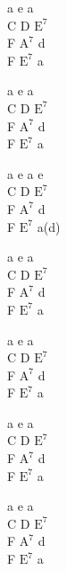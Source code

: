 \begin{chord}
    a e a\\
    C D $\mathrm{E^7}$\\
    F $\mathrm{A^7}$ d\\
    F $\mathrm{E^7}$ a

    a e a\\
    C D $\mathrm{E^7}$\\
    F $\mathrm{A^7}$ d\\
    F $\mathrm{E^7}$ a

    a e a e\\
    C D $\mathrm{E^7}$\\
    F $\mathrm{A^7}$ d\\
    F $\mathrm{E^7}$ a(d)

    a e a\\
    C D $\mathrm{E^7}$\\
    F $\mathrm{A^7}$ d\\
    F $\mathrm{E^7}$ a

    a e a\\
    C D $\mathrm{E^7}$\\
    F $\mathrm{A^7}$ d\\
    F $\mathrm{E^7}$ a

    a e a\\
    C D $\mathrm{E^7}$\\
    F $\mathrm{A^7}$ d\\
    F $\mathrm{E^7}$ a

    a e a\\
    C D $\mathrm{E^7}$\\
    F $\mathrm{A^7}$ d\\
    F $\mathrm{E^7}$ a
\end{chord}
